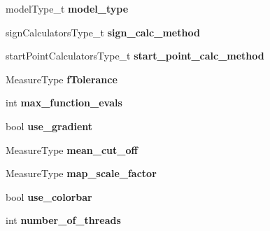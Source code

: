 \begin{DoxyCompactItemize}
\item 
\hypertarget{struct_ox_1_1_tomato_options_a4a5e32c79e597006aaaa79600ddaa564}{model\-Type\-\_\-t {\bfseries model\-\_\-type}}\label{struct_ox_1_1_tomato_options_a4a5e32c79e597006aaaa79600ddaa564}

\item 
\hypertarget{struct_ox_1_1_tomato_options_a2cf923d6d04fb8cb510db2623e93119d}{sign\-Calculators\-Type\-\_\-t {\bfseries sign\-\_\-calc\-\_\-method}}\label{struct_ox_1_1_tomato_options_a2cf923d6d04fb8cb510db2623e93119d}

\item 
\hypertarget{struct_ox_1_1_tomato_options_a9da2993961d10c848b0860284900c869}{start\-Point\-Calculators\-Type\-\_\-t {\bfseries start\-\_\-point\-\_\-calc\-\_\-method}}\label{struct_ox_1_1_tomato_options_a9da2993961d10c848b0860284900c869}

\item 
\hypertarget{struct_ox_1_1_tomato_options_ae2ac4c46e46b4d183c6944771701040b}{Measure\-Type {\bfseries f\-Tolerance}}\label{struct_ox_1_1_tomato_options_ae2ac4c46e46b4d183c6944771701040b}

\item 
\hypertarget{struct_ox_1_1_tomato_options_a9b864c01b6b0b4e4d5a56470f6c5f004}{int {\bfseries max\-\_\-function\-\_\-evals}}\label{struct_ox_1_1_tomato_options_a9b864c01b6b0b4e4d5a56470f6c5f004}

\item 
\hypertarget{struct_ox_1_1_tomato_options_a367c540e5413f8ffa3a6bc6ef5781b45}{bool {\bfseries use\-\_\-gradient}}\label{struct_ox_1_1_tomato_options_a367c540e5413f8ffa3a6bc6ef5781b45}

\item 
\hypertarget{struct_ox_1_1_tomato_options_af81d1a55409036109d253b313d59e972}{Measure\-Type {\bfseries mean\-\_\-cut\-\_\-off}}\label{struct_ox_1_1_tomato_options_af81d1a55409036109d253b313d59e972}

\item 
\hypertarget{struct_ox_1_1_tomato_options_ab245e10cf32b36c48d66208a5f505099}{Measure\-Type {\bfseries map\-\_\-scale\-\_\-factor}}\label{struct_ox_1_1_tomato_options_ab245e10cf32b36c48d66208a5f505099}

\item 
\hypertarget{struct_ox_1_1_tomato_options_aa762826a11ff767aa969bd66c29b577f}{bool {\bfseries use\-\_\-colorbar}}\label{struct_ox_1_1_tomato_options_aa762826a11ff767aa969bd66c29b577f}

\item 
\hypertarget{struct_ox_1_1_tomato_options_a54efb4945f2857ee4ed9e1d5552fc3dd}{int {\bfseries number\-\_\-of\-\_\-threads}}\label{struct_ox_1_1_tomato_options_a54efb4945f2857ee4ed9e1d5552fc3dd}


\end{DoxyCompactItemize}
